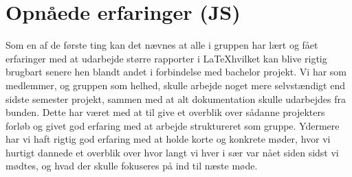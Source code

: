 \chapter{Opnåede erfaringer (JS)}

Som en af de første ting kan det nævnes at alle i gruppen har lært og fået erfaringer med at udarbejde større rapporter i \LaTeX hvilket kan blive rigtig brugbart senere hen blandt andet i forbindelse med bachelor projekt.\newline
Vi har som medlemmer, og gruppen som helhed, skulle arbejde noget mere selvstændigt end sidste semester projekt, sammen med at alt dokumentation skulle udarbejdes fra bunden. Dette har været med at til give et overblik over sådanne projekters forløb og givet god erfaring med at arbejde struktureret som gruppe. Ydermere har vi haft rigtig god erfaring med at holde korte og konkrete møder, hvor vi hurtigt dannede et overblik over hvor langt vi hver i sær var nået siden sidst vi mødtes, og hvad der skulle fokuseres på ind til næste møde.

